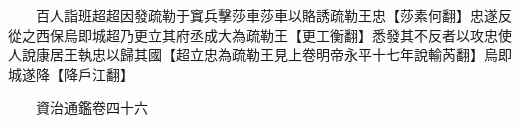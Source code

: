 　　百人詣班超超因發疏勒于窴兵擊莎車莎車以賂誘疏勒王忠【莎素何翻】忠遂反從之西保烏即城超乃更立其府丞成大為疏勒王【更工衡翻】悉發其不反者以攻忠使人說康居王執忠以歸其國【超立忠為疏勒王見上卷明帝永平十七年說輸芮翻】烏即城遂降【降戶江翻】

　　資治通鑑卷四十六  
    


 


 



 

 
  







 


　　
　　
　
　
　


　　

　















	
	









































 
  



















 





 












  
  
  

 





